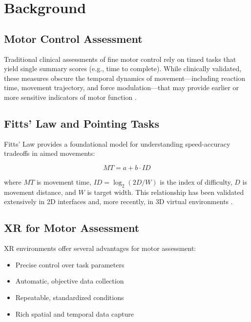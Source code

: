 \documentclass[11pt,twocolumn]{article}
\begin{document}
\section{Background}

\subsection{Motor Control Assessment}

Traditional clinical assessments of fine motor control rely on timed tasks that yield single summary scores (e.g., time to complete). While clinically validated, these measures obscure the temporal dynamics of movement—including reaction time, movement trajectory, and force modulation—that may provide earlier or more sensitive indicators of motor function \citep{wei2019tapping}.

\subsection{Fitts' Law and Pointing Tasks}

Fitts' Law \citep{fitts1954information} provides a foundational model for understanding speed-accuracy tradeoffs in aimed movements:

\begin{equation}
    MT = a + b \cdot ID
\end{equation}

where $MT$ is movement time, $ID = \log_2(2D/W)$ is the index of difficulty, $D$ is movement distance, and $W$ is target width. This relationship has been validated extensively in 2D interfaces and, more recently, in 3D virtual environments \citep{lu2019modeling}.

\subsection{XR for Motor Assessment}

XR environments offer several advantages for motor assessment:

\begin{itemize}
    \item Precise control over task parameters
    \item Automatic, objective data collection
    \item Repeatable, standardized conditions
    \item Rich spatial and temporal data capture
\end{itemize}
\end{document}
